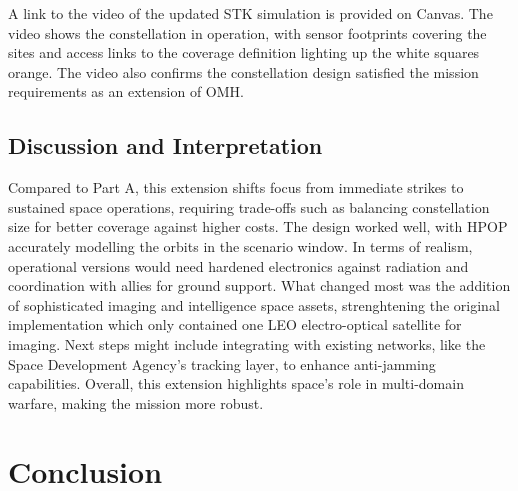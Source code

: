 \documentclass{article}
\newif\ifpartB
\begin{document}
A link to the video of the updated STK simulation is provided on Canvas. The video shows the constellation in operation, with sensor footprints covering the sites and access links to the coverage definition lighting up the white squares orange. The video also confirms the constellation design satisfied the mission requirements as an extension of OMH.


\subsection{Discussion and Interpretation}
Compared to Part A, this extension shifts focus from immediate strikes to sustained space operations, requiring trade-offs such as balancing constellation size for better coverage against higher costs. The design worked well, with HPOP accurately modelling the orbits in the scenario window. In terms of realism, operational versions would need hardened electronics against radiation and coordination with allies for ground support. What changed most was the addition of sophisticated imaging and intelligence space assets, strenghtening the original implementation which only contained one LEO electro-optical satellite for imaging. Next steps might include integrating with existing networks, like the Space Development Agency's tracking layer, to enhance anti-jamming capabilities. Overall, this extension highlights space's role in multi-domain warfare, making the mission more robust.

\fi

\section{Conclusion} \label{sec:conclusion}
\ifpartB
\end{document}
